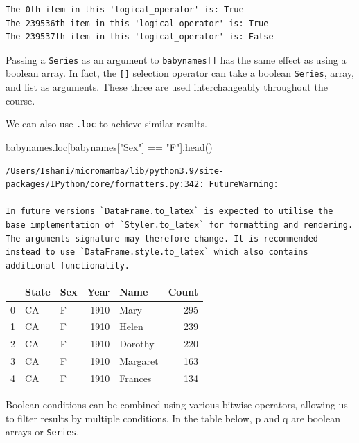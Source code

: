 \documentclass[
  letterpaper,
  DIV=11,
  numbers=noendperiod]{scrreprt}
\newenvironment{Shaded}{\begin{snugshade}}{\end{snugshade}}
\newcommand{\NormalTok}[1]{\textcolor[rgb]{0.00,0.23,0.31}{#1}}
\newcommand{\OperatorTok}[1]{\textcolor[rgb]{0.37,0.37,0.37}{#1}}
\newcommand{\StringTok}[1]{\textcolor[rgb]{0.13,0.47,0.30}{#1}}
\begin{document}
\begin{verbatim}
The 0th item in this 'logical_operator' is: True
The 239536th item in this 'logical_operator' is: True
The 239537th item in this 'logical_operator' is: False
\end{verbatim}

Passing a \texttt{Series} as an argument to \texttt{babynames{[}{]}} has
the same effect as using a boolean array. In fact, the \texttt{{[}{]}}
selection operator can take a boolean \texttt{Series}, array, and list
as arguments. These three are used interchangeably throughout the
course.

We can also use \texttt{.loc} to achieve similar results.

\begin{Shaded}
\begin{Highlighting}[]
\NormalTok{babynames.loc[babynames[}\StringTok{"Sex"}\NormalTok{] }\OperatorTok{==} \StringTok{"F"}\NormalTok{].head()}
\end{Highlighting}
\end{Shaded}

\begin{verbatim}
/Users/Ishani/micromamba/lib/python3.9/site-packages/IPython/core/formatters.py:342: FutureWarning:

In future versions `DataFrame.to_latex` is expected to utilise the base implementation of `Styler.to_latex` for formatting and rendering. The arguments signature may therefore change. It is recommended instead to use `DataFrame.style.to_latex` which also contains additional functionality.
\end{verbatim}

\begin{tabular}{lllrlr}
\toprule
{} & State & Sex &  Year &      Name &  Count \\
\midrule
0 &    CA &   F &  1910 &      Mary &    295 \\
1 &    CA &   F &  1910 &     Helen &    239 \\
2 &    CA &   F &  1910 &   Dorothy &    220 \\
3 &    CA &   F &  1910 &  Margaret &    163 \\
4 &    CA &   F &  1910 &   Frances &    134 \\
\bottomrule
\end{tabular}

Boolean conditions can be combined using various bitwise operators,
allowing us to filter results by multiple conditions. In the table
below, p and q are boolean arrays or \texttt{Series}.
\end{document}
